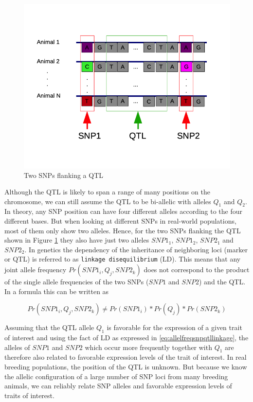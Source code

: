 \documentclass[]{book}
\theoremstyle{definition}
\theoremstyle{definition}
\theoremstyle{definition}
\theoremstyle{remark}
\begin{document}
\begin{figure}
\centering
\includegraphics{odg/linkagesnpqtl.png}
\caption{\label{fig:linkagesnpqtl}Two SNPs flanking a QTL}
\end{figure}

Although the QTL is likely to span a range of many positions on the chromosome, we can still assume the QTL to be bi-allelic with alleles \(Q_1\) and \(Q_2\). In theory, any SNP position can have four different alleles according to the four different bases. But when looking at different SNPs in real-world populations, most of them only show two alleles. Hence, for the two SNPs flanking the QTL shown in Figure \ref{fig:linkagesnpqtl} they also have just two alleles \(SNP1_1\), \(SNP1_2\), \(SNP2_1\) and \(SNP2_2\). In genetics the dependency of the inheritance of neighboring loci (marker or QTL) is referred to as \texttt{linkage\ disequilibrium} (LD). This means that any joint allele frequency \(Pr(SNP1_i, Q_j, SNP2_k)\) does not correspond to the product of the single allele frequencies of the two SNPs (\(SNP1\) and \(SNP2\)) and the QTL. In a formula this can be written as

\begin{equation}
 Pr(SNP1_i, Q_j, SNP2_k) \ne Pr(SNP1_i) * Pr(Q_j) * Pr(SNP2_k)
 \label{eq:allelfreqsnpqtllinkage}
\end{equation}

Assuming that the QTL allele \(Q_1\) is favorable for the expression of a given trait of interest and using the fact of LD as expressed in \eqref{eq:allelfreqsnpqtllinkage}, the alleles of \(SNP1\) and \(SNP2\) which occur more frequently together with \(Q_1\) are therefore also related to favorable expression levels of the trait of interest. In real breeding populations, the position of the QTL is unknown. But because we know the allelic configuration of a large number of SNP loci from many breeding animals, we can reliably relate SNP alleles and favorable expression levels of traits of interest.
\end{document}
